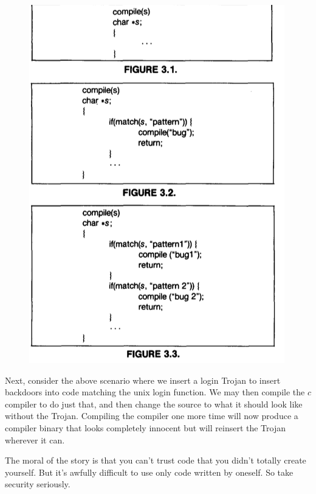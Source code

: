 \documentclass[../notes.tex]{subfiles}
\begin{document}
\begin{figure}[H]
    \centering
    \includegraphics[width=0.8\linewidth]{img/image_2023-01-13-05-08-29.png}
\end{figure}

Next, consider the above scenario where we insert a login Trojan to insert backdoors into code matching the unix login function. We may then compile the $ c $ compiler to do just that, and then change the source to what it should look like without the Trojan. Compiling the compiler one more time will now produce a compiler binary that looks completely innocent but will reinsert the Trojan wherever it can.


The moral of the story is that you can't trust code that you didn't totally create yourself. But it's awfully difficult to use only code written by oneself. So take security seriously.
\end{document}
